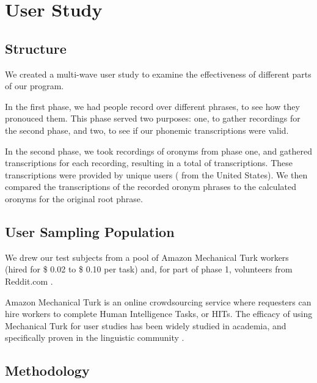 \chapter{User Study}
\label{userStudy}

\section{Structure} We created a multi-wave user study to examine the effectiveness of different parts of our program. 

In the first phase, we had \uniqueUsersPhaseOneUserStudy people record over \numResponsesPhaseOneUserStudy different phrases, to see how they pronouced them.  This phase served two purposes: one, to gather recordings for the second phase, and two, to see if our phonemic transcriptions were valid.  

In the second phase, we took \recordingsPhaseTwoUserStudy recordings of oronyms from phase one, and gathered \numTranscriptionsPerRecordingPhaseTwoUserStudy transcriptions for each recording, resulting in a total of \numResponsesPhaseTwoUserStudy transcriptions. These transcriptions were provided by \uniqueUsersPhaseTwoUserStudy unique users ( \uniqueUsersPhaseTwoUserStudyUSA from the United States).  We then compared the transcriptions of the recorded oronym phrases to the calculated oronyms for the original root phrase.

\section{User Sampling Population}
We drew our test subjects from a pool of Amazon Mechanical Turk workers (hired for \$ 0.02 to \$ 0.10 per task) and, for part of phase 1, volunteers from Reddit.com \cite{redditAssistance} \cite{redditRecordThis}. 

Amazon Mechanical Turk is an online crowdsourcing service where requesters can hire workers to complete Human Intelligence Tasks, or HITs.  The efficacy of using Mechanical Turk for user studies has been widely studied in academia, and specifically proven in the linguistic community \cite{sprouse_validation_2011}.


\section{Methodology}

